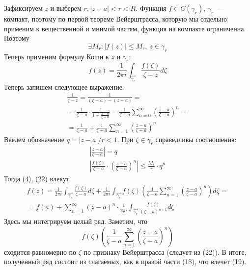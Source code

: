 \documentclass[main]{subfiles}
\begin{document}
\begin{longProof}
    Зафиксируем $z$ и выберем $r: |z - a| < r < R$.
    Функция $f \in C(\gamma_r)$, $\gamma_r$~--- компакт, поэтому по первой теореме Вейерштрасса, которую мы отдельно применим к вещественной и мнимой частям, функция на компакте ограниченна.
    Поэтому
    \[\exists M_r: |f(z)| \le  M_r,\ z \in \gamma_r \tag{20}\]
    Теперь применим формулу Коши к $z$ и $\gamma_r$:
    \[f(z) = \frac{1}{2 \pi i} \int_{\overrightarrow{\gamma_r}} \frac{f(\zeta)}{\zeta - z} d\zeta \tag{4}\]
    Теперь запишем следующее выражение:
    \begin{multline*}
        \frac{1}{\zeta - z} = \frac{1}{(\zeta - a) - (z - a)} = \\
        = \frac{1}{\zeta - a} \cdot \frac{1}{1 - \frac{z - a}{\zeta - a}} = \frac{1}{\zeta - a} \sum_{n = 0 }^{\infty} \left(\frac{z - a}{\zeta -a}\right)^n = \\
        = \frac{1}{\zeta - a} + \frac{1}{\zeta - a} \sum_{n = 1 }^{\infty} \left(\frac{z - a}{\zeta -a}\right)^n \tag{21}
    \end{multline*}
    Введем обозначение $q = |z - a|/r < 1$.
    При $\zeta \in \gamma_r$ справедливы соотношения:
    \begin{gather*}
        \left| \frac{z - a}{\zeta - a}\right| = q\\
        \left| \frac{f(\zeta)}{\zeta - a} \cdot \left( \frac{z - a}{\zeta - a} \right)^n \right| \le \frac{M_r}{r} \cdot q^n \tag{22}
    \end{gather*}
    Тогда (4), (22) влекут
    \begin{multline*}
        f(z) = \frac{1}{2 \pi i} \int_{\overrightarrow{\gamma_r}} \frac{f(\zeta)}{\zeta - a} d\zeta + \frac{1}{2 \pi i} \int_{\overrightarrow{\gamma_r}} f(\zeta) \left(\frac{1}{\zeta - a}  \sum_{n = 1 }^{\infty} \left(\frac{z - a}{\zeta -a}\right)^n\right)d\zeta = \\
        = f(a) + \sum_{n=1}^{\infty} (z-a)^n \cdot \frac{1}{2 \pi i} \int_{\overrightarrow{\gamma_r}} \frac{f(\zeta)}{(\zeta - a)^{n+1}} d\zeta
    \end{multline*}
    Здесь мы интегрируем целый ряд.
    Заметим, что
    \[f(\zeta) \left(\frac{1}{\zeta - a}  \sum_{n = 1 }^{\infty} \left(\frac{z - a}{\zeta -a}\right)^n\right)\]
    сходится равномерно по $\zeta$ по признаку Вейерштрасса (следует из (22)).
    В итоге, полученный ряд состоит из слагаемых, как в правой части (18), что влечет (19).
\end{longProof}
\end{document}
